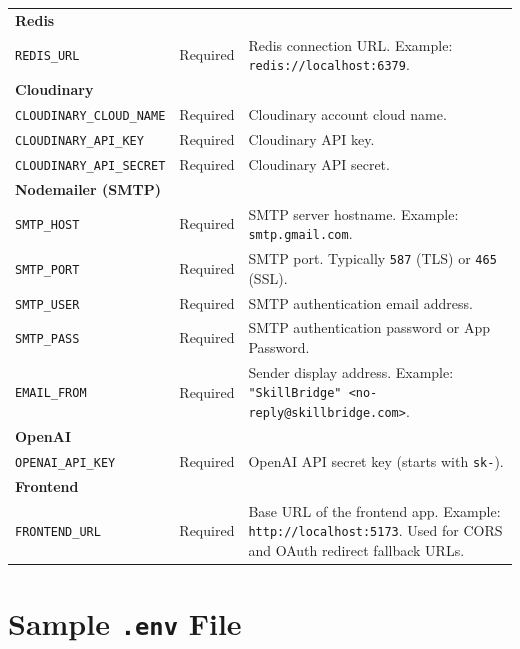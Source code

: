 \begin{longtable}{p{5.5cm} p{3cm} p{6cm}}
\multicolumn{3}{l}{\textbf{Redis}} \\[4pt]
\texttt{REDIS\_URL}              & Required  & Redis connection URL. Example: \texttt{redis://localhost:6379}. \\[8pt]

\multicolumn{3}{l}{\textbf{Cloudinary}} \\[4pt]
\texttt{CLOUDINARY\_CLOUD\_NAME} & Required  & Cloudinary account cloud name. \\
\texttt{CLOUDINARY\_API\_KEY}    & Required  & Cloudinary API key. \\
\texttt{CLOUDINARY\_API\_SECRET} & Required  & Cloudinary API secret. \\[8pt]

\multicolumn{3}{l}{\textbf{Nodemailer (SMTP)}} \\[4pt]
\texttt{SMTP\_HOST}              & Required  & SMTP server hostname. Example: \texttt{smtp.gmail.com}. \\
\texttt{SMTP\_PORT}              & Required  & SMTP port. Typically \texttt{587} (TLS) or \texttt{465} (SSL). \\
\texttt{SMTP\_USER}              & Required  & SMTP authentication email address. \\
\texttt{SMTP\_PASS}              & Required  & SMTP authentication password or App Password. \\
\texttt{EMAIL\_FROM}             & Required  & Sender display address. Example: \texttt{"SkillBridge" <no-reply@skillbridge.com>}. \\[8pt]

\multicolumn{3}{l}{\textbf{OpenAI}} \\[4pt]
\texttt{OPENAI\_API\_KEY}        & Required  & OpenAI API secret key (starts with \texttt{sk-}). \\[8pt]

\multicolumn{3}{l}{\textbf{Frontend}} \\[4pt]
\texttt{FRONTEND\_URL}           & Required  & Base URL of the frontend app. Example: \texttt{http://localhost:5173}. Used for CORS and OAuth redirect fallback URLs. \\[8pt]

\end{longtable}

\section*{Sample \texttt{.env} File}

